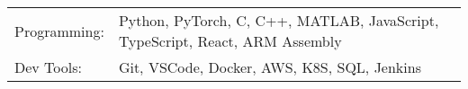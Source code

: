 \begin{tabularx}{\linewidth}{@{}l X@{}}
Programming: &  \normalsize{Python, PyTorch, C, C++, MATLAB, JavaScript, TypeScript, React, ARM Assembly}\\
Dev Tools:  &  \normalsize{Git, VSCode, Docker, AWS, K8S, SQL, Jenkins}\\
\end{tabularx}